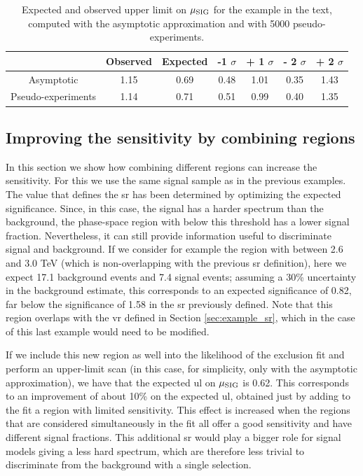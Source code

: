 \begin{table}
\centering
\begin{tabular}{|c|c|c|c|c|c|c|}
\hline 
 & Observed  & Expected &  -1 $\sigma$ & + 1 $\sigma$ & - 2 $\sigma$ &  + 2 $\sigma$ \\ 
\hline 
Asymptotic & 1.15 & 0.69 & 0.48 & 1.01 & 0.35 & 1.43 \\ 
\hline 
Pseudo-experiments & 1.14 & 0.71 & 0.51 & 0.99 & 0.40 & 1.35 \\ 
\hline 
\end{tabular} 
\caption{Expected and observed upper limit on $\mu_{\rm SIG}$ for the example in the text, 
computed with the asymptotic approximation and with 5000 pseudo-experiments.}
\label{tab:stat:exampleUL}
\end{table}



\subsection{Improving the sensitivity by combining regions}
\label{sec:example_combi}

In this section we show how combining different regions can increase the sensitivity. 
For this we use the same signal sample as in the previous examples. 
The \meff value that defines the \gls{sr} has been determined by optimizing the expected significance. 
Since, in this case, the signal has a harder \meff spectrum than the background, the phase-space region 
with \meff below this threshold has a lower signal fraction. Nevertheless, it can still provide information useful to
discriminate signal and background. If we consider for example the region with \meff between 2.6 and 3.0 TeV (which is non-overlapping with 
the previous \gls{sr} definition), here we expect 17.1 background events and 7.4 signal events;
assuming a 30\% uncertainty in the background estimate, this corresponds to an expected significance of 0.82, far below the significance of 1.58 in the 
\gls{sr} previously defined. Note that this region overlaps with the \gls{vr} defined in Section \ref{sec:example_sr}, which in the case of this last example would need to be modified.

If we include this new region as well into the likelihood of the exclusion fit and perform an upper-limit scan (in this case, for simplicity, only with the asymptotic approximation), we have that the expected \gls{ul} on $\mu_{\rm SIG}$ is 0.62. This corresponds to an improvement of about 10\% on the expected \gls{ul}, obtained just by adding to the fit a region with limited sensitivity. This effect is increased when the regions that are considered simultaneously in the fit all offer a good sensitivity and have different signal fractions. 
This additional \gls{sr} would play a bigger role for signal models giving a less hard \meff spectrum, 
which are therefore less trivial to discriminate from the background with a single selection. 



